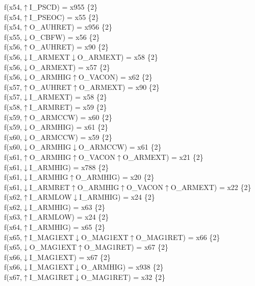 f(x54,$\uparrow$I\_PSCD) = x955 \{2\} \\  
f(x54,$\uparrow$I\_PSEOC) = x55 \{2\} \\  
f(x54,$\uparrow$O\_AUHRET) = x956 \{2\} \\  
f(x55,$\downarrow$O\_CBFW) = x56 \{2\} \\  
f(x56,$\uparrow$O\_AUHRET) = x90 \{2\} \\  
f(x56,$\downarrow$I\_ARMEXT$\downarrow$O\_ARMEXT) = x58 \{2\} \\  
f(x56,$\downarrow$O\_ARMEXT) = x57 \{2\} \\  
f(x56,$\downarrow$O\_ARMHIG$\uparrow$O\_VACON) = x62 \{2\} \\  
f(x57,$\uparrow$O\_AUHRET$\uparrow$O\_ARMEXT) = x90 \{2\} \\  
f(x57,$\downarrow$I\_ARMEXT) = x58 \{2\} \\  
f(x58,$\uparrow$I\_ARMRET) = x59 \{2\} \\  
f(x59,$\uparrow$O\_ARMCCW) = x60 \{2\} \\  
f(x59,$\downarrow$O\_ARMHIG) = x61 \{2\} \\  
f(x60,$\downarrow$O\_ARMCCW) = x59 \{2\} \\  
f(x60,$\downarrow$O\_ARMHIG$\downarrow$O\_ARMCCW) = x61 \{2\} \\  
f(x61,$\uparrow$O\_ARMHIG$\uparrow$O\_VACON$\uparrow$O\_ARMEXT) = x21 \{2\} \\  
f(x61,$\downarrow$I\_ARMHIG) = x788 \{2\} \\  
f(x61,$\downarrow$I\_ARMHIG$\uparrow$O\_ARMHIG) = x20 \{2\} \\  
f(x61,$\downarrow$I\_ARMRET$\uparrow$O\_ARMHIG$\uparrow$O\_VACON$\uparrow$O\_ARMEXT) = x22 \{2\} \\  
f(x62,$\uparrow$I\_ARMLOW$\downarrow$I\_ARMHIG) = x24 \{2\} \\  
f(x62,$\downarrow$I\_ARMHIG) = x63 \{2\} \\  
f(x63,$\uparrow$I\_ARMLOW) = x24 \{2\} \\  
f(x64,$\uparrow$I\_ARMHIG) = x65 \{2\} \\  
f(x65,$\uparrow$I\_MAG1EXT$\downarrow$O\_MAG1EXT$\uparrow$O\_MAG1RET) = x66 \{2\} \\  
f(x65,$\downarrow$O\_MAG1EXT$\uparrow$O\_MAG1RET) = x67 \{2\} \\  
f(x66,$\downarrow$I\_MAG1EXT) = x67 \{2\} \\  
f(x66,$\downarrow$I\_MAG1EXT$\downarrow$O\_ARMHIG) = x938 \{2\} \\  
f(x67,$\uparrow$I\_MAG1RET$\downarrow$O\_MAG1RET) = x32 \{2\} \\  
